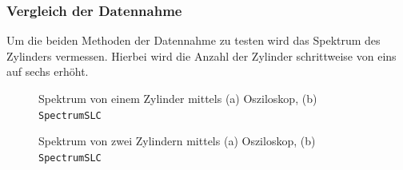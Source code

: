 \subsubsection{Vergleich der Datennahme}
Um die beiden Methoden der Datennahme zu testen wird das Spektrum des Zylinders vermessen.
Hierbei wird die Anzahl der Zylinder schrittweise von eins auf sechs erhöht.
\FloatBarrier
\begin{figure}
    \caption{Spektrum von einem Zylinder mittels (a) Osziloskop, (b) \texttt{SpectrumSLC}}
\end{figure}
\begin{figure}
    \caption{Spektrum von zwei Zylindern mittels (a) Osziloskop, (b) \texttt{SpectrumSLC}}
\end{figure}
